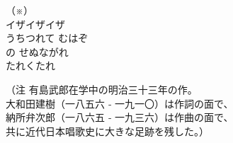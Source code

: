 \documentclass[10pt,b5j]{tarticle} %
\begin{document}
\begin{enumerate}
\begin{minipage}[c]{\blocksize}
    \end{minipage}
    \begin{minipage}[c]{0.5\hsize}

        \vspace{\linespace}
        \item[（※）]~\\
        イザイザイザ\\
        うちつれて
        むはぞ\\
        の
        せぬながれ\\
        たれくたれ\\

    \end{minipage}
    \begin{minipage}[c]{0.5\hsize}

        \vspace{\linespace}
        （注 有島武郎在学中の明治三十三年の作。\\
        大和田建樹（一八五六 ‐ 一九一〇）は作詞の面で、\\
        納所弁次郎（一八六五 ‐ 一九三六）は作曲の面で、\\
        共に近代日本唱歌史に大きな足跡を残した。）

    \end{minipage}
\end{enumerate} %
\end{document}

